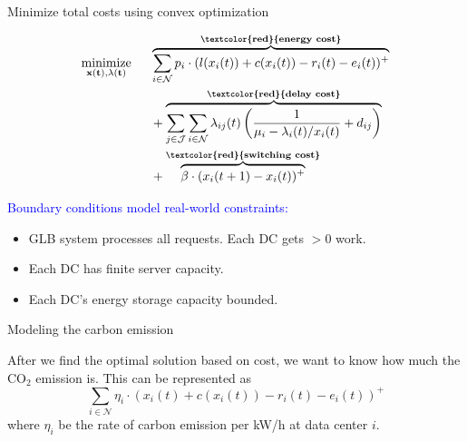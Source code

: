 \documentclass[xcolor=dvipsnames]{beamer}
\newcommand{\carbondioxide}{\ensuremath{\mathrm{CO}_2}}
\begin{document}
\begin{frame}{Minimize total costs using convex optimization}

\begin{align*}
&\underset{\bf{x}(t), \bf{\lambda}(t)}{\text{minimize}} & \hspace{0.5em}
	& \overbrace{ \sum_{i \in \mathcal{N}} p_i \cdot (l(x_i(t)) + c(x_i(t)) - r_i(t) - e_i(t))^+ }^{\text{\textbf{\textcolor{red}{energy cost}}}} \\
	&&& {} + \overbrace{ \sum_{j \in \mathcal{J}}\sum_{i \in \mathcal{N}} \lambda_{ij}(t)\left(\frac{1}{\mu_i - \lambda_i(t)/x_i(t)} + d_{ij}\right) }^{\text{\textbf{\textcolor{red}{delay cost}}}}  \\
	&&& {} + \overbrace{ \beta \cdot (x_i(t+1) - x_i(t))^+ }^{\text{\textbf{\textcolor{red}{switching cost}}}}
\end{align*}
\vspace{-2mm}


	\begin{block}{\textcolor{blue}{Boundary conditions model real-world constraints:}}
	\begin{itemize}
	\item
	GLB system processes all requests. Each DC gets $>0$ work.
	\item
	Each DC has finite server capacity. %
	\item
	Each DC's energy storage capacity bounded.
	\end{itemize}
	\end{block}
\end{frame}

\begin{frame}{Modeling the carbon emission}

After we find the optimal solution based on cost, we want to know how much the \carbondioxide{} emission is. This can be represented as 
	$$\sum_{i \in \mathcal{N}} \eta_i \cdot (x_i(t) + c(x_i(t)) - r_i(t) - e_i(t))^+$$
where $\eta_i$ be the rate of carbon emission per kW/h at data center $i$.
\end{frame}
\end{document}
